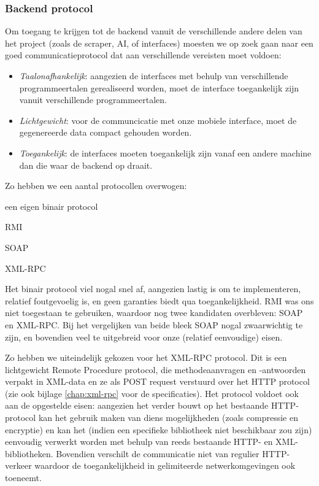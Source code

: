 \subsubsection{Backend protocol}

Om toegang te krijgen tot de backend vanuit de verschillende andere delen van het project (zoals de scraper, AI, of interfaces) moesten we op zoek gaan naar een goed communicatieprotocol dat aan verschillende vereisten moet voldoen:
\begin{itemize}
\item{\emph{Taalonafhankelijk}: aangezien de interfaces met behulp van verschillende programmeertalen gerealiseerd worden, moet de interface toegankelijk zijn vanuit verschillende programmeertalen.}
\item{\emph{Lichtgewicht}: voor de communcicatie met onze mobiele interface, moet de gegenereerde data compact gehouden worden.}
\item{\emph{Toegankelijk}: de interfaces moeten toegankelijk zijn vanaf een andere machine dan die waar de backend op draait.}
\end{itemize}

Zo hebben we een aantal protocollen overwogen:
\begin{itemize_compact}
\item{een eigen binair protocol}
\item{RMI}
\item{SOAP}
\item{XML-RPC}
\end{itemize_compact}

Het binair protocol viel nogal snel af, aangezien lastig is om te implementeren, relatief foutgevoelig is, en geen garanties biedt qua toegankelijkheid. RMI was ons niet toegestaan te gebruiken, waardoor nog twee kandidaten overbleven: SOAP en XML-RPC. Bij het vergelijken van beide bleek SOAP nogal zwaarwichtig te zijn, en bovendien veel te uitgebreid voor onze (relatief eenvoudige) eisen.

Zo hebben we uiteindelijk gekozen voor het XML-RPC protocol. Dit is een lichtgewicht Remote Procedure protocol, die methodeaanvragen en -antwoorden verpakt in XML-data en ze als POST request verstuurd over het HTTP protocol (zie ook bijlage \ref{chap:xml-rpc} voor de specificaties).
Het protocol voldoet ook aan de opgestelde eisen: aangezien het verder bouwt op het bestaande HTTP-protocol kan het gebruik maken van diens mogelijkheden (zoals compressie en encryptie) en kan het (indien een specifieke bibliotheek niet beschikbaar zou zijn) eenvoudig verwerkt worden met behulp van reeds bestaande HTTP- en XML-bibliotheken. Bovendien verschilt de communicatie niet van regulier HTTP-verkeer waardoor de toegankelijkheid in gelimiteerde netwerkomgevingen ook toeneemt.

